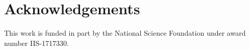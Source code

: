 \section{Acknowledgements}
This work is funded in part by the National Science Foundation under award number IIS-1717330.